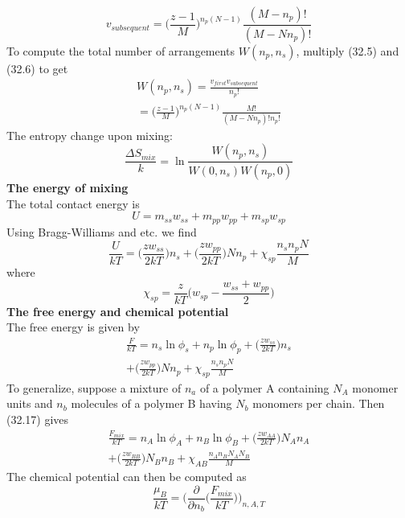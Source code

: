 \documentclass[8pt]{article}
\numberwithin{equation}{section}
\begin{document}
\begin{multicols}{2}
\begin{equation}
v_{subsequent}=\bigg(\frac{z-1}{M} \bigg)^{n_{p}(N-1)}\frac{(M-n_{p})!}{(M-Nn_{p})!} \tag{32.6}
\end{equation}
To compute the total number of arrangements $W(n_{p},n_{s})$, multiply (32.5) and (32.6) to get 
\begin{gather}
W(n_{p},n_{s})=\frac{v_{first}v_{subsequent}}{n_{p}!} \tag{.} \\ =\bigg(\frac{z-1}{M} \bigg)^{n_{p}(N-1)}\frac{M!}{(M-Nn_{p})!n_{p}!} \tag{32.7}
\end{gather}
The entropy change upon mixing:
\begin{equation}
\frac{\Delta S_{mix}}{k}=\ln{\frac{W(n_{p},n_{s})}{W(0,n_{s})W(n_{p},0)}} \tag{32.8}
\end{equation}
\textbf{The energy of mixing} \\
The total contact energy is
\begin{equation}
U=m_{ss}w_{ss}+m_{pp}w_{pp}+m_{sp}w_{sp} \tag{32.13}
\end{equation}
Using Bragg-Williams and etc. we find
\begin{equation}
\frac{U}{kT}=\bigg(\frac{zw_{ss}}{2kT} \bigg)n_{s}+\bigg(\frac{zw_{pp}}{2kT} \bigg)Nn_{p}+\chi_{sp}\frac{n_{s}n_{p}N}{M} \tag{32.15}
\end{equation}
where 
\begin{equation}
\chi_{sp}=\frac{z}{kT}\bigg(w_{sp}-\frac{w_{ss}+w_{pp}}{2} \bigg) \tag{32.16}
\end{equation}
\textbf{The free energy and chemical potential} \\
The free energy is given by 
\begin{gather}
\frac{F}{kT}=n_{s}\ln{\phi_{s}}+n_{p}\ln{\phi_{p}}+\bigg(\frac{zw_{ss}}{2kT} \bigg)n_{s} \tag{.} \\+\bigg(\frac{zw_{pp}}{2kT} \bigg)Nn_{p}  +\chi_{sp}\frac{n_{s}n_{p}N}{M} \tag{32.17}
\end{gather}
To generalize, suppose a mixture of $n_{a}$ of a polymer A containing $N_{A}$ monomer units and $n_{b}$ molecules of a polymer B having $N_{b}$ monomers per chain. Then (32.17) gives
\begin{gather}
\frac{F_{mix}}{kT}=n_{A}\ln{\phi_{A}}+n_{B}\ln{\phi_{B}}+\bigg(\frac{zw_{AA}}{2kT} \bigg)N_{A}n_{A} \tag{.} \\+\bigg(\frac{zw_{BB}}{2kT} \bigg)N_{B}n_{B}  +\chi_{AB}\frac{n_{A}n_{B}N_{A}N_{B}}{M} \tag{32.17}
\end{gather}
The chemical potential can then be computed as \begin{equation}
\frac{\mu_{B}}{kT}=\bigg(\frac{\partial}{\partial n_{b}}\bigg(\frac{F_{mix}}{kT} \bigg) \bigg)_{n,A,T} \tag{32.19}
\end{equation}
\end{multicols}
\end{document}

